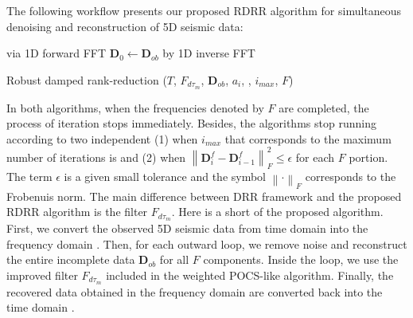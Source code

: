 The following workflow presents our proposed RDRR algorithm for simultaneous denoising and reconstruction of 5D seismic data:

\begin{center}
	\begin{algorithm}[H]
		\DontPrintSemicolon
		 via 1D forward FFT\;    
		$\mathbf{D}_0\leftarrow\mathbf{D}_{ob}$\;
		 by 1D inverse FFT\;		
		\caption{Robust damped rank-reduction ($T$, {${F}_{d\tau_m}$}, $\mathbf{D}_{ob}$, $a_{i}$, \wen{$\epsilon$}, $i_{max}$, $F$)}
	\end{algorithm}
\end{center}

In both algorithms, when the frequencies denoted by ${F}$ are completed, the process of iteration stops immediately. Besides, the algorithms stop running according to two independent  (1) when {$i_{max}$} that corresponds to the maximum number of iterations is  and (2) when {$\left\|\mathbf{D}^f_i - \mathbf{D}^f_{i-1}\right\|_F^2\leq \epsilon$} for each ${F}$ portion. The term $\epsilon$ is a given small tolerance and the symbol {$\left\|\cdot\right\|_F$} corresponds to the Frobenuis norm. The main difference between DRR framework and the proposed RDRR algorithm is the filter {${F}_{d\tau_m}$}. Here is a short  of the proposed algorithm. First, we convert the observed 5D seismic data from time domain  into the frequency domain . Then, for each outward loop, we remove noise and reconstruct the entire incomplete data {$\mathbf{D}_{ob}$} for all ${F}$ components. Inside the loop, we use the improved filter {${F}_{d\tau_m}$} included in the weighted POCS-like algorithm. Finally, the recovered data  obtained in the frequency domain are converted back into the time domain .

